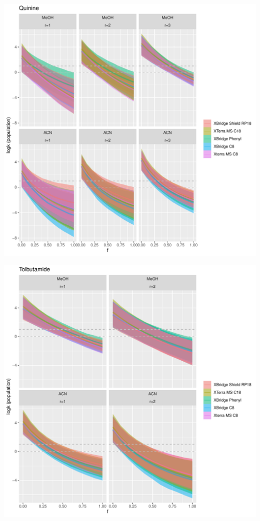\documentclass[
]{article}
\begin{document}
\newpage{}

\includegraphics{../figures/izoparam/isopred/Quinine.population.pdf}

\newpage{}

\includegraphics{../figures/izoparam/isopred/Tolbutamide.population.pdf}
\end{document}
